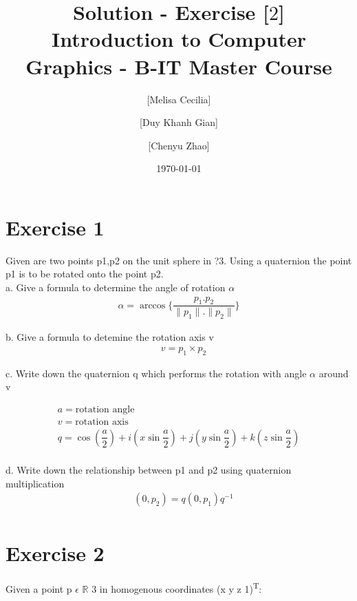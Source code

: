\documentclass[10pt,a4paper]{article}
\begin{document}
\title{Solution - Exercise [$2$]\\
\small{Introduction to Computer Graphics - B-IT Master Course}}
\author{ [Melisa Cecilia] \and [Duy Khanh Gian] \and [Chenyu Zhao]}
\date{\today}
\maketitle

\section*{Exercise 1}
Given are two points p1,p2 on the unit sphere in ?3. Using a quaternion the point p1 is to be rotated onto the point p2.\\

a. Give a formula to determine the angle of rotation $\alpha$
\begin{gather*}
\alpha = \arccos{\{\dfrac{p_1.p_2}{\|p_1\|.\|p_2\|}\}}
\end{gather*}

b. Give a formula to detemine the rotation axis v
\begin{gather*}
\quad v = p_1\times p_2
\end{gather*}

c. Write down the quaternion q which performs the rotation with angle $\alpha$ around v

\begin{gather*}
a = \text{rotation angle} \\
v = \text{rotation axis} \\
q = \cos(\dfrac{a}{2}) + i (x \sin\dfrac{a}{2}) + j (y \sin\dfrac{a}{2}) + k ( z \sin\dfrac{a}{2}) \\
\end{gather*}

d. Write down the relationship between p1 and p2 using quaternion multiplication
\begin{gather*}
\quad (0, p_2) = q(0, p_1)q^{-1} \\
\end{gather*}

\section*{Exercise 2}

Given a point p $\epsilon$ $\mathbb{R}$ 3 in homogenous coordinates (x y z 1)\textsuperscript{T}: \\
\end{document}
